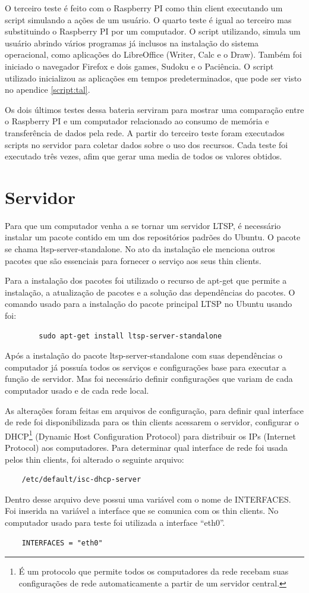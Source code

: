 \documentclass[
	12pt,				%
	openright,			%
	twoside,			%
	a4paper,			%
	chapter=TITLE,		%
	english,			%
	brazil				%
	]{abntex2}
\begin{document}
O terceiro teste é feito com o Raspberry PI como thin client executando um script simulando a ações de um usuário. O quarto teste é igual ao terceiro mas substituindo o  Raspberry PI por um computador. O script utilizando, simula um usuário abrindo vários programas já inclusos na instalação do sistema operacional, como aplicações do LibreOffice (Writer, Calc e o Draw). Também foi iniciado o navegador Firefox e dois games, Sudoku e o Paciência. O script utilizado inicializou as aplicações em tempos predeterminados, que pode ser visto no apendice \ref{script:tal}.

Os dois últimos testes dessa bateria serviram para mostrar uma comparação entre o Raspberry PI e um computador relacionado ao consumo de memória e transferência de dados pela rede. A partir do terceiro teste foram executados scripts no servidor para coletar dados sobre o uso dos recursos. Cada teste foi executado três vezes, afim que gerar uma media de todos os valores obtidos. 


\chapter{Servidor}
\label{confServ}
Para que um computador venha a se tornar um servidor LTSP, é necessário instalar um pacote contido em um dos repositórios padrões do Ubuntu. O pacote se chama  ltsp-server-standalone. No ato da instalação ele menciona outros pacotes que são  essenciais para fornecer o serviço aos seus thin clients.

Para a instalação dos pacotes foi utilizado o recurso de apt-get que permite a instalação, a atualização de pacotes e a solução das dependências do pacotes\cite{apt_get}. O comando usado para a instalação do pacote principal LTSP no Ubuntu usando foi:
\begin{verbatim}
		sudo apt-get install ltsp-server-standalone
\end{verbatim}
Após a instalação do pacote ltsp-server-standalone com suas dependências o computador já possuía todos os serviços e configurações base para executar a função de servidor. Mas foi necessário definir configurações que variam de cada computador usado e de cada rede local. 

As alterações foram feitas em arquivos de configuração, para definir qual interface de rede foi disponibilizada para os thin clients acessarem o servidor,  configurar o DHCP\footnote{É um protocolo que permite todos os computadores da rede recebam suas configurações de rede automaticamente a partir de um servidor central\cite{dhcp}.} (Dynamic Host Configuration Protocol) para distribuir os IPs (Internet Protocol) aos computadores. Para determinar qual interface de rede foi usada pelos thin clients, foi alterado o seguinte arquivo:
\begin{verbatim}
	/etc/default/isc-dhcp-server
\end{verbatim}  
Dentro desse arquivo deve possui uma variável com o nome de INTERFACES. Foi inserida na variável a interface que se comunica com os thin clients. No computador usado para teste foi utilizada a interface “eth0”.
\begin{verbatim}
	INTERFACES = "eth0"
\end{verbatim}
\end{document}
